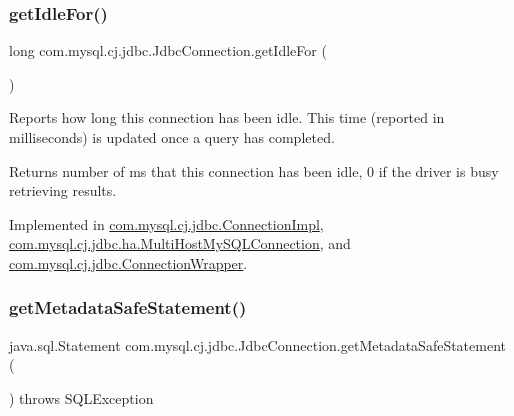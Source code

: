 \subsubsection{\texorpdfstring{get\+Idle\+For()}{getIdleFor()}}
{\footnotesize\ttfamily long com.\+mysql.\+cj.\+jdbc.\+Jdbc\+Connection.\+get\+Idle\+For (\begin{DoxyParamCaption}{ }\end{DoxyParamCaption})}

Reports how long this connection has been idle. This time (reported in milliseconds) is updated once a query has completed.

\begin{DoxyReturn}{Returns}
number of ms that this connection has been idle, 0 if the driver is busy retrieving results. 
\end{DoxyReturn}


Implemented in \mbox{\hyperlink{classcom_1_1mysql_1_1cj_1_1jdbc_1_1_connection_impl_a628961d1155b35d0582a3198c2a6bb83}{com.\+mysql.\+cj.\+jdbc.\+Connection\+Impl}}, \mbox{\hyperlink{classcom_1_1mysql_1_1cj_1_1jdbc_1_1ha_1_1_multi_host_my_s_q_l_connection_a640187b96b3d091f9b74a927c754098c}{com.\+mysql.\+cj.\+jdbc.\+ha.\+Multi\+Host\+My\+S\+Q\+L\+Connection}}, and \mbox{\hyperlink{classcom_1_1mysql_1_1cj_1_1jdbc_1_1_connection_wrapper_a4894df9d353212ae8b4e0860c15e6a6e}{com.\+mysql.\+cj.\+jdbc.\+Connection\+Wrapper}}.

\mbox{\label{interfacecom_1_1mysql_1_1cj_1_1jdbc_1_1_jdbc_connection_ab48793a6beae119da08e7ae9e982c6c0}} 
\subsubsection{\texorpdfstring{get\+Metadata\+Safe\+Statement()}{getMetadataSafeStatement()}}
{\footnotesize\ttfamily java.\+sql.\+Statement com.\+mysql.\+cj.\+jdbc.\+Jdbc\+Connection.\+get\+Metadata\+Safe\+Statement (\begin{DoxyParamCaption}{ }\end{DoxyParamCaption}) throws S\+Q\+L\+Exception}



